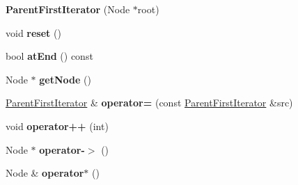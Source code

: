 \begin{DoxyCompactItemize}
\item 
{\bfseries Parent\+First\+Iterator} (Node $\ast$root)\hypertarget{classirr_1_1core_1_1map_1_1ParentFirstIterator_a357ac1c340fd19bb14e28a7d168371e1}{}\label{classirr_1_1core_1_1map_1_1ParentFirstIterator_a357ac1c340fd19bb14e28a7d168371e1}

\item 
void {\bfseries reset} ()\hypertarget{classirr_1_1core_1_1map_1_1ParentFirstIterator_af31332a1d7256060bcb8dbb82ca6496a}{}\label{classirr_1_1core_1_1map_1_1ParentFirstIterator_af31332a1d7256060bcb8dbb82ca6496a}

\item 
bool {\bfseries at\+End} () const \hypertarget{classirr_1_1core_1_1map_1_1ParentFirstIterator_ae3ffab18920aed9315081c324a350818}{}\label{classirr_1_1core_1_1map_1_1ParentFirstIterator_ae3ffab18920aed9315081c324a350818}

\item 
Node $\ast$ {\bfseries get\+Node} ()\hypertarget{classirr_1_1core_1_1map_1_1ParentFirstIterator_a51055e1698217a8a718066505a05ecbf}{}\label{classirr_1_1core_1_1map_1_1ParentFirstIterator_a51055e1698217a8a718066505a05ecbf}

\item 
\hyperlink{classirr_1_1core_1_1map_1_1ParentFirstIterator}{Parent\+First\+Iterator} \& {\bfseries operator=} (const \hyperlink{classirr_1_1core_1_1map_1_1ParentFirstIterator}{Parent\+First\+Iterator} \&src)\hypertarget{classirr_1_1core_1_1map_1_1ParentFirstIterator_a51a80976e2b3df0f1ac950c4b8d59426}{}\label{classirr_1_1core_1_1map_1_1ParentFirstIterator_a51a80976e2b3df0f1ac950c4b8d59426}

\item 
void {\bfseries operator++} (int)\hypertarget{classirr_1_1core_1_1map_1_1ParentFirstIterator_a43bf9ef9131d11a110112c55bf9b2503}{}\label{classirr_1_1core_1_1map_1_1ParentFirstIterator_a43bf9ef9131d11a110112c55bf9b2503}

\item 
Node $\ast$ {\bfseries operator-\/$>$} ()\hypertarget{classirr_1_1core_1_1map_1_1ParentFirstIterator_a18dd8259483e19753969987a979040f6}{}\label{classirr_1_1core_1_1map_1_1ParentFirstIterator_a18dd8259483e19753969987a979040f6}

\item 
Node \& {\bfseries operator$\ast$} ()\hypertarget{classirr_1_1core_1_1map_1_1ParentFirstIterator_af1aa7b281ef68cf163e286e14a198126}{}\label{classirr_1_1core_1_1map_1_1ParentFirstIterator_af1aa7b281ef68cf163e286e14a198126}

\end{DoxyCompactItemize}


